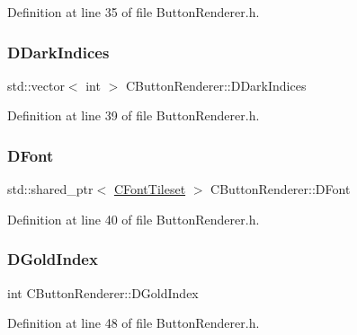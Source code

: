Definition at line 35 of file Button\+Renderer.\+h.

\hypertarget{classCButtonRenderer_a0f0723933f4800dcded7a4d180a87831}{}\label{classCButtonRenderer_a0f0723933f4800dcded7a4d180a87831} 
\subsubsection{\texorpdfstring{D\+Dark\+Indices}{DDarkIndices}}
{\footnotesize\ttfamily std\+::vector$<$ int $>$ C\+Button\+Renderer\+::\+D\+Dark\+Indices\hspace{0.3cm}{\ttfamily [protected]}}



Definition at line 39 of file Button\+Renderer.\+h.

\hypertarget{classCButtonRenderer_adcdace35cb4fac1c90368b7cc86d860a}{}\label{classCButtonRenderer_adcdace35cb4fac1c90368b7cc86d860a} 
\subsubsection{\texorpdfstring{D\+Font}{DFont}}
{\footnotesize\ttfamily std\+::shared\+\_\+ptr$<$ \hyperlink{classCFontTileset}{C\+Font\+Tileset} $>$ C\+Button\+Renderer\+::\+D\+Font\hspace{0.3cm}{\ttfamily [protected]}}



Definition at line 40 of file Button\+Renderer.\+h.

\hypertarget{classCButtonRenderer_aba9e3360876958aad5eb83c66b2c4ae5}{}\label{classCButtonRenderer_aba9e3360876958aad5eb83c66b2c4ae5} 
\subsubsection{\texorpdfstring{D\+Gold\+Index}{DGoldIndex}}
{\footnotesize\ttfamily int C\+Button\+Renderer\+::\+D\+Gold\+Index\hspace{0.3cm}{\ttfamily [protected]}}



Definition at line 48 of file Button\+Renderer.\+h.

